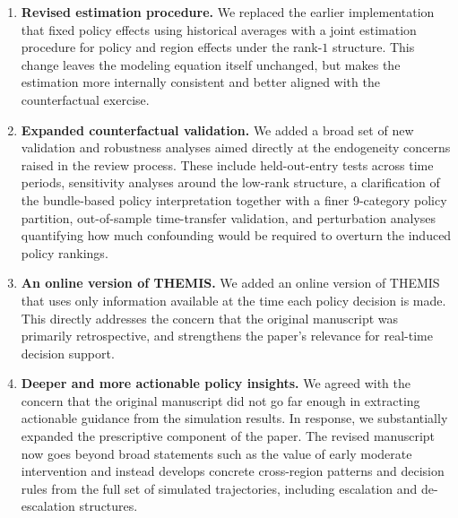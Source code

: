 \documentclass[letterpaper,twoside,11pt]{reviewresponse}
\begin{document}
\begin{enumerate}
\item \textbf{Revised estimation procedure.} We replaced the earlier implementation that fixed policy effects using historical averages with a joint estimation procedure for policy and region effects under the rank-$1$ structure. This change leaves the modeling equation itself unchanged, but makes the estimation more internally consistent and better aligned with the counterfactual exercise.

\item \textbf{Expanded counterfactual validation.} We added a broad set of new validation and robustness analyses aimed directly at the endogeneity concerns raised in the review process. These include held-out-entry tests across time periods, sensitivity analyses around the low-rank structure, a clarification of the bundle-based policy interpretation together with a finer 9-category policy partition, out-of-sample time-transfer validation, and perturbation analyses quantifying how much confounding would be required to overturn the induced policy rankings.

\item \textbf{An online version of THEMIS.} We added an online version of THEMIS that uses only information available at the time each policy decision is made. This directly addresses the concern that the original manuscript was primarily retrospective, and strengthens the paper’s relevance for real-time decision support.

\item \textbf{Deeper and more actionable policy insights.} We agreed with the concern that the original manuscript did not go far enough in extracting actionable guidance from the simulation results. In response, we substantially expanded the prescriptive component of the paper. The revised manuscript now goes beyond broad statements such as the value of early moderate intervention and instead develops concrete cross-region patterns and decision rules from the full set of simulated trajectories, including escalation and de-escalation structures.
\end{enumerate}
\end{document}
